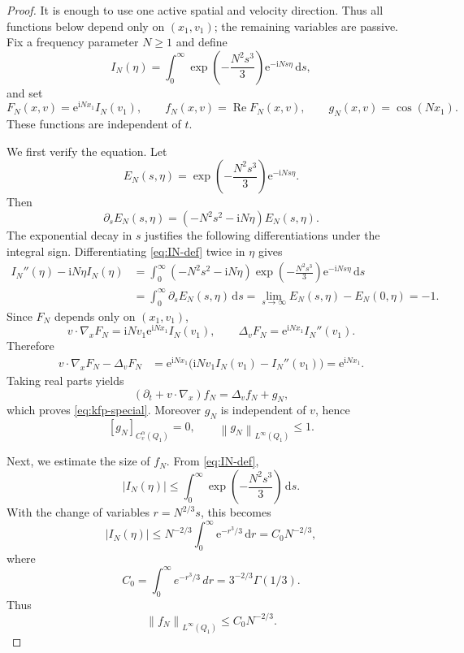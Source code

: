 \documentclass[11pt,reqno]{amsart}
\numberwithin{equation}{section}
\theoremstyle{remark}
\newcommand{\ii}{\mathrm{i}}
\newcommand{\e}{\mathrm{e}}
\newcommand{\dd}{\,\mathrm{d}}
\newcommand{\norm}[1]{\left\|#1\right\|}
\begin{document}
\begin{proof}
It is enough to use one active spatial and velocity direction.  Thus all functions below depend only on $(x_1,v_1)$; the remaining variables are passive.  Fix a frequency parameter $N\ge1$ and define
\begin{equation}\label{eq:IN-def}
   I_N(\eta)=\int_0^\infty
      \exp\left(-\frac{N^2s^3}{3}\right)\e^{-\ii Ns\eta}\dd s,
\end{equation}
and set
\begin{equation}\label{eq:fN-gN-def}
   F_N(x,v)=\e^{\ii Nx_1}I_N(v_1),
   \qquad
   f_N(x,v)=\operatorname{Re}F_N(x,v),
   \qquad
   g_N(x,v)=\cos(Nx_1).
\end{equation}
These functions are independent of $t$.

We first verify the equation.  Let
\[
   E_N(s,\eta)=\exp\left(-\frac{N^2s^3}{3}\right)\e^{-\ii Ns\eta}.
\]
Then
\[
   \partial_sE_N(s,\eta)=(-N^2s^2-\ii N\eta)E_N(s,\eta).
\]
The exponential decay in $s$ justifies the following differentiations under the integral sign.  Differentiating \eqref{eq:IN-def} twice in $\eta$ gives
\[
\begin{aligned}
   I_N''(\eta)-\ii N\eta I_N(\eta)
   &=\int_0^\infty (-N^2s^2-\ii N\eta)
       \exp\left(-\frac{N^2s^3}{3}\right)\e^{-\ii Ns\eta}\dd s \\
   &=\int_0^\infty \partial_sE_N(s,\eta)\dd s
     =\lim_{s\to\infty}E_N(s,\eta)-E_N(0,\eta)=-1.
\end{aligned}
\]
Since $F_N$ depends only on $(x_1,v_1)$,
\[
   v\cdot\nabla_xF_N=\ii Nv_1\e^{\ii Nx_1}I_N(v_1),
   \qquad
   \Delta_vF_N=\e^{\ii Nx_1}I_N''(v_1).
\]
Therefore
\[
\begin{aligned}
   v\cdot\nabla_xF_N-\Delta_vF_N
   &=\e^{\ii Nx_1}\big(\ii Nv_1I_N(v_1)-I_N''(v_1)\big)
     =\e^{\ii Nx_1}.
\end{aligned}
\]
Taking real parts yields
\[
   (\partial_t+v\cdot\nabla_x)f_N=\Delta_vf_N+g_N,
\]
which proves \eqref{eq:kfp-special}.  Moreover $g_N$ is independent of $v$, hence
\[
   [g_N]_{C_v^\alpha(Q_1)}=0,
   \qquad
   \norm{g_N}_{L^\infty(Q_1)}\le1.
\]

Next, we estimate the size of $f_N$.  From \eqref{eq:IN-def},
\[
   |I_N(\eta)|\le \int_0^\infty \exp\left(-\frac{N^2s^3}{3}\right)\dd s.
\]
With the change of variables $r=N^{2/3}s$, this becomes
\[
   |I_N(\eta)|\le N^{-2/3}\int_0^\infty \e^{-r^3/3}\dd r
   = C_0N^{-2/3},
\]
where
\[
   C_0=\int_0^\infty e^{-r^3/3}\,dr=3^{-2/3}\Gamma(1/3).
\]
Thus
\begin{equation}\label{eq:fN-Linfty}
   \norm{f_N}_{L^\infty(Q_1)}\le C_0N^{-2/3}.
\end{equation}


\end{proof}
\end{document}
